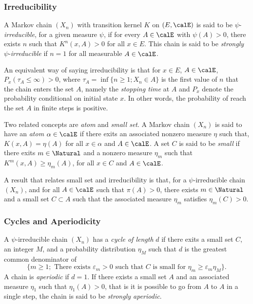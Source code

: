 \subsubsection{Irreducibility}

A Markov chain $(X_n)$ with transition kernel $K$ on $(E,\calE)$ is said to be
$\psi$-\emph{irreducible}, for a given measure $\psi$, if for every
$A\in\calE$ with $\psi(A)>0$, there exists $n$ such that $K^n(x,A)>0$ for all
$x\in E$. This chain is said to be \emph{strongly} $\psi$-\emph{irreducible}
if $n=1$ for all measurable $A\in\calE$.

An equivalent way of saying irreducibility is that for $x\in E$, $A\in\calE$,
$P_x(\tau_A\le\infty) > 0$, where $\tau_A = \inf\{n\ge1;X_n\in A\}$ is the
first value of $n$ that the chain enters the set $A$, namely the
\emph{stopping time} at $A$ and $P_x$ denote the probability conditional on
initial state $x$. In other words, the probability of reach the set $A$ in
finite steps is positive.

Two related concepts are \emph{atom} and \emph{small set}. A Markov chain
$(X_n)$ is said to have an \emph{atom} $\alpha\in\calE$  if there exits an
associated nonzero measure $\eta$ such that, $K(x,A) = \eta(A)$ for all
$x\in\alpha$ and $A\in\calE$. A set $C$ is said to be \emph{small} if there
exits $m\in\Natural$ and a nonzero measure $\eta_m$ such that
$K^m(x,A)\ge\eta_m(A)$, for all $x\in C$ and $A\in\calE$.

A result that relates small set and irreducibility is that, for a
$\psi$-irreducible chain $(X_n)$, and for all $A\in\calE$ such that
$\pi(A)>0$, there exists $m\in\Natural$ and a small set $C\subset A$ such that
the associated measure $\eta_m$ satisfies $\eta_m(C) > 0$.

\subsubsection{Cycles and Aperiodicity}

A $\psi$-irreducible chain $(X_n)$ has a \emph{cycle of length} $d$ if there
exits a small set $C$, an integer $M$, and a probability distribution $\eta_M$
such that $d$ is the greatest common denominator of
\begin{equation*}
  \{m\ge1;\text{ There exists }\varepsilon_m > 0\text{ such that }C\text{ is
    small for }\eta_m\ge\varepsilon_m\eta_M\}.
\end{equation*}
A chain is \emph{aperiodic} if $d = 1$. If there exists a small set $A$ and an
associated measure $\eta_1$ such that $\eta_1(A) > 0$, that is it is possible
to go from $A$ to $A$ in a single step, the chain is said to be
\emph{strongly aperiodic}.

